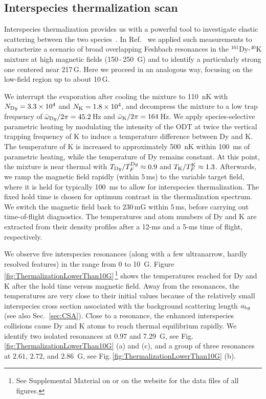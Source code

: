 \subsection{\label{sec:InterThemScan}Interspecies thermalization scan}

Interspecies thermalization provides us with a powerful tool to investigate elastic scattering between the two species~\cite{Mosk2001mou}. In Ref.~\cite{Ravensbergen2020rif} we applied such measurements to characterize a scenario of broad overlapping Feshbach resonances in the $^{161}$Dy-$^{40}$K mixture at high magnetic fields (150\,-\,250~G) and to identify a particularly strong one centered near 217\,G. Here we proceed in an analogous way, focusing on the low-field region up to about 10\,G.

We interrupt the evaporation after cooling the mixture to \SI{110}{nK} with ${N_{\textrm Dy}=3.3\times10^{4}}$ and $N_{\textrm K}=1.8\times10^{4}$, and decompress the mixture to a low trap frequency of $\bar{\omega}_{\textrm Dy}/2\pi=45.2$\,Hz and $\bar{\omega}_{\textrm K}/2\pi=164$\,Hz. We apply species-selective parametric heating by modulating the intensity of the ODT at twice the vertical trapping frequency of K to induce a temperature difference between Dy and K. The temperature of K is increased to approximately \SI{500}{nK} within \SI{100}{ms} of parametric heating, while the temperature of Dy remains constant. At this point, the mixture is near thermal with $T_{\textrm Dy}/T_F^{\textrm Dy}\approx0.9$ and $T_{\textrm K}/T_F^{\textrm K}\approx1.3$. Afterwards, we ramp the magnetic field rapidly (within $5$\,ms) to the variable target field, where it is held for typically \SI{100}{ms} to allow for interspecies thermalization. The fixed hold time is chosen for optimum contrast in the thermalization spectrum. We switch the magnetic field back to $230$\,mG within $5$\,ms, before carrying out time-of-flight diagnostics. The temperatures and atom numbers of Dy and K are extracted from their density profiles after a 12-ms and a 5-ms time of flight, respectively.

We observe five interspecies resonances (along with a few ultranarrow, hardly resolved features) in the range from $0$ to \SI{10}{G}. Figure\,\ref{fig:ThermalizationLowerThan10G}\,\footnote{See Supplemental Material on  or on the  website for the data files of all figures.} shows the temperatures reached for Dy and K after the hold time versus magnetic field. Away from the resonances, the temperatures are very close to their initial values because of the relatively small interspecies cross section associated with the background scattering length $a_{\textrm bg}$ (see also Sec.~\ref{sec:CSA}). Close to a resonance, the enhanced interspecies collisions cause Dy and K atoms to reach thermal equilibrium rapidly. We identify two isolated resonances at $0.97$ and \SI{7.29}{G}, see Fig.\,\ref{fig:ThermalizationLowerThan10G} (a) and (c), and a group of three resonances at $2.61$, $2.72$, and \SI{2.86}{G}, see Fig.\,\ref{fig:ThermalizationLowerThan10G} (b).

